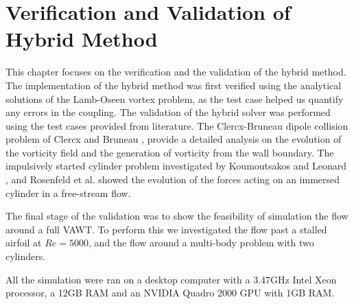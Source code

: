 \chapter{Verification and Validation of Hybrid Method}
\label{ch:vavohm}



This chapter focuses on the verification and the validation of the hybrid method. The implementation of the hybrid method was first verified using the analytical solutions of the Lamb-Oseen vortex problem, as the test case helped us quantify any errors in the coupling. The validation of the hybrid solver was performed using the test cases provided from literature. The Clercx-Bruneau dipole collision problem of Clercx and Bruneau \cite{Clercx2006a}, provide a detailed analysis on the evolution of the vorticity field and the generation of vorticity from the wall boundary. The impulsively started cylinder problem investigated by Koumoutsakos and Leonard \cite{Koumoutsakos1995a}, and Rosenfeld et al. \cite{MosheRosenFeldDochanKwak1991} showed the evolution of the forces acting on an immersed cylinder in a free-stream flow.

The final stage of the validation was to show the feasibility of simulation the flow around a full VAWT. To perform this we investigated the flow past a stalled airfoil at $Re=5000$, and the flow around a multi-body problem with two cylinders.

All the simulation were ran on a desktop computer with a 3.47GHz Intel Xeon processor, a 12GB RAM and an NVIDIA Quadro 2000 GPU with 1GB RAM.

